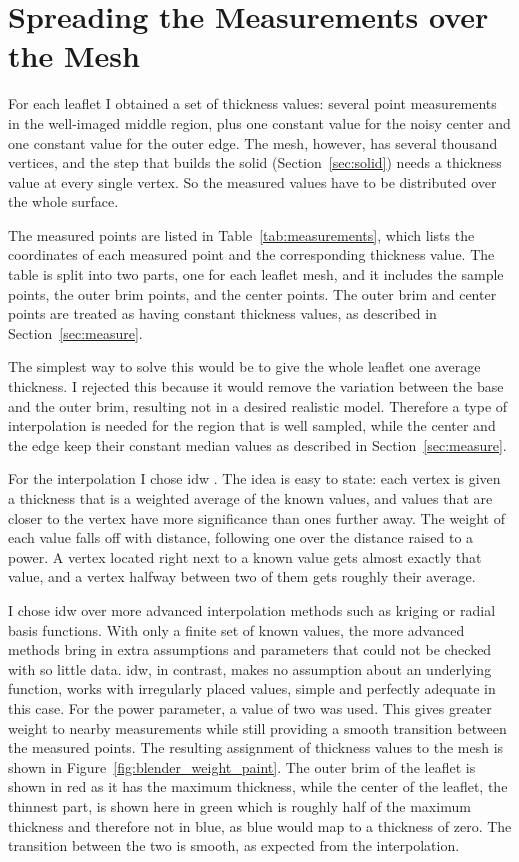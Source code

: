 \section{Spreading the Measurements over the Mesh}\label{sec:interp}

For each leaflet I obtained a set of thickness values: several point
measurements in the well-imaged middle region, plus one constant value for the
noisy center and one constant value for the outer edge. The mesh, however, has
several thousand vertices, and the step that builds the solid
(Section~\ref{sec:solid}) needs a thickness value at every single vertex. So the
measured values have to be distributed over the whole surface.

The measured points are listed in Table~\ref{tab:measurements}, which lists the coordinates of each measured point and the corresponding thickness value. The table is split into two parts, one for each leaflet mesh, and it includes the sample points, the outer brim points, and the center points. The outer brim and center points are treated as having constant thickness values, as described in Section~\ref{sec:measure}.

The simplest way to solve this would be to give the whole leaflet one average
thickness. I rejected this because it would remove the variation between the base
and the outer brim, resulting not in a desired realistic model. Therefore a type of
interpolation is needed for the region that is well sampled, while the center and
the edge keep their constant median values as described in
Section~\ref{sec:measure}.

For the interpolation I chose \gls{idw} \cite{shepard1968two}. The idea is easy
to state: each vertex is given a thickness that is a weighted average of the known
values, and values that are closer to the vertex have more significance than ones further
away. The weight of each value falls off with distance, following one over the
distance raised to a power. A vertex located right next to a known value gets
almost exactly that value, and a vertex halfway between two of them gets roughly
their average.

I chose \gls{idw} over more advanced interpolation methods such as kriging or radial
basis functions. With only a finite set of known values, the more
advanced methods bring in extra assumptions and parameters that could not be
checked with so little data. \Gls{idw}, in contrast, makes no assumption about an
underlying function, works with irregularly placed values, simple and perfectly adequate in this case. For the power parameter, a value of two was used. This gives greater weight to nearby measurements while still providing a smooth transition between the measured points. The resulting assignment of thickness values to the mesh is shown in Figure~\ref{fig:blender_weight_paint}. The outer brim of the leaflet is shown in red as it has the maximum thickness, while the center of the leaflet, the thinnest part, is shown here in green which is roughly half of the maximum thickness and therefore not in blue, as blue would map to a thickness of zero. The transition between the two is smooth, as expected from the interpolation.

